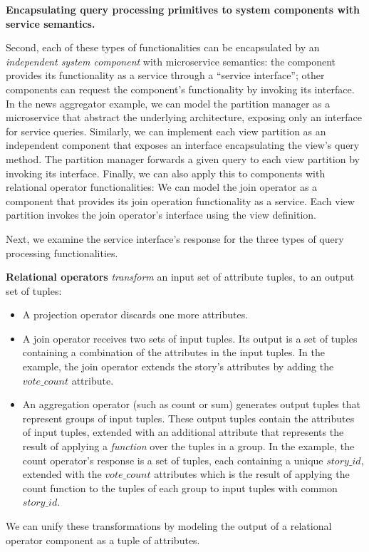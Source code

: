 \vspace{12pt}
\noindent
\textbf{Encapsulating query processing primitives to system components with service semantics.}

\noindent
Second, each of these types of functionalities can be encapsulated by an \textit{independent system component} with microservice semantics:
the component provides its functionality as a service through a ``service interface'';
other components can request the component's functionality by invoking its interface.
In the news aggregator example,
we can model the partition manager as a microservice that abstract the underlying architecture,
exposing only an interface for service queries.
Similarly,
we can implement each view partition as an independent component that exposes an interface encapsulating the view's query method.
The partition manager forwards a given query to each view partition by invoking its interface.
Finally, we can also apply this to components with relational operator functionalities:
We can model the join operator as a component that provides its join operation functionality as a service.
Each view partition invokes the join operator's interface using the view definition.

Next, we examine the service interface's response for the three types of query processing functionalities.

  \medskip
  \noindent
  \textbf{Relational operators} \textit{transform} an input set of attribute tuples, to an output set of tuples:
    \begin{itemize}
    \item A projection operator discards one more attributes.
    \item A join operator receives two sets of input tuples.
    Its output is a set of tuples containing a combination of the attributes in the input tuples.
    In the example, the join operator extends the story's attributes by adding the $vote\_count$ attribute.
    \item An aggregation operator (such as count or sum) generates output tuples that represent groups of input tuples.
    These output tuples contain the attributes of input tuples, extended with an additional attribute that represents the
    result of applying a \textit{function} over the tuples in a group.
    In the example, the count operator's response is a set of tuples,
    each containing a unique $story\_id$, extended with the $vote\_count$ attributes
    which is the result of applying the count function to the tuples of each group to input tuples with common $story\_id$.
    \end{itemize}
  We can unify these transformations by modeling the output of a relational operator component as a tuple of attributes.

